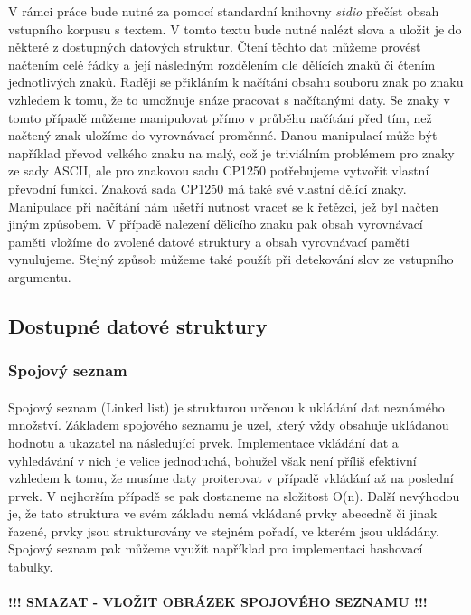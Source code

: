 ﻿\documentclass[12pt, a4paper]{article}
\begin{document}
V rámci práce bude nutné za pomocí standardní knihovny \textit{stdio} přečíst obsah vstupního korpusu s textem. V tomto textu bude nutné nalézt slova a uložit je do některé z dostupných datových struktur. Čtení těchto dat můžeme provést načtením celé řádky a její následným rozdělením dle dělících znaků či čtením jednotlivých znaků. Raději se přikláním k načítání obsahu souboru znak po znaku vzhledem k tomu, že to umožnuje snáze pracovat s načítanými daty. Se znaky v tomto případě můžeme manipulovat přímo v průběhu načítání před tím, než načtený znak uložíme do vyrovnávací proměnné. Danou manipulací může být například převod velkého znaku na malý, což je triviálním problémem pro znaky ze sady ASCII, ale pro znakovou sadu CP1250 potřebujeme vytvořit vlastní převodní funkci. Znaková sada CP1250 má také své vlastní dělící znaky. Manipulace při načítání nám ušetří nutnost vracet se k řetězci, jež byl načten jiným způsobem. V případě nalezení dělicího znaku pak obsah vyrovnávací paměti vložíme do zvolené datové struktury a obsah vyrovnávací paměti vynulujeme. Stejný způsob můžeme také použít při detekování slov ze vstupního argumentu.

\subsection{Dostupné datové struktury}
\subsubsection{Spojový seznam}
\paragraph{}
Spojový seznam (Linked list) je strukturou určenou k ukládání dat neznámého množství. Základem spojového seznamu je uzel, který vždy obsahuje ukládanou hodnotu a ukazatel na následující prvek. Implementace vkládání dat a vyhledávání v nich je velice jednoduchá, bohužel však není příliš efektivní vzhledem k tomu, že musíme daty proiterovat v případě vkládání až na poslední prvek. V nejhorším případě se pak dostaneme na složitost O(n). Další nevýhodou je, že tato struktura ve svém základu nemá vkládané prvky abecedně či jinak řazené, prvky jsou strukturovány ve stejném pořadí, ve kterém jsou ukládány. Spojový seznam pak můžeme využít například pro implementaci hashovací tabulky.

\paragraph{}
\textbf{!!! SMAZAT - VLOŽIT OBRÁZEK SPOJOVÉHO SEZNAMU !!!}
\end{document}
